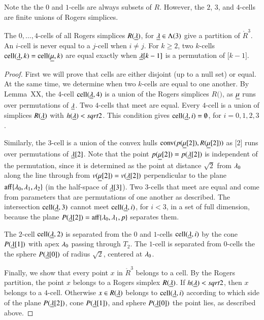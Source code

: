 Note the the $0$ and $1$-cells are always subsets of $R$.  However, the $2$, $3$, and
$4$-cells are finite unions of Rogers simplices.

\begin{lemma}  The $0,\ldots,4$-cells of all Rogers simplices $R({\underline{\lambda}})$, for ${\underline{\lambda}}\in \Lambda(3)$
give a partition of $\ring{R}^3$.  An $i$-cell is never equal to a $j$-cell when $i\ne j$. For $k\ge 2$, 
two $k$-cells $\operatorname{cell}({\underline{\lambda}},k)=\operatorname{cell}({\underline{\mu}},k)$ are equal exactly when ${\underline{\lambda}}[k-1]$
is a permutation of $\bm[k-1]$.
\end{lemma}

\begin{proof}  First we will prove that cells are either disjoint (up to a null set) or equal.  At the same
time, we determine when two $k$-cells are equal to one another.
By Lemma~XX, the $4$-cell $\operatorname{cell}({\underline{\lambda}},4)$ is a union of the Rogers simplices
$R(\bm)$, as ${\underline{\mu}}$ runs over permutations of ${\underline{\lambda}}$. 
 Two $4$-cells
that meet are equal. 
Every $4$-cell is a union of simplices
$R({\underline{\lambda}})$ with $h({\underline{\lambda}})<sqrt2$.  This condition gives $\operatorname{cell}({\underline{\lambda}},i)=\emptyset$, for $i=0,1,2,3$.

Similarly, the $3$-cell is a union
of the convex hulls ${\operatorname{conv}}(p({\underline{\mu}}[2]),R({\underline{\mu}}[2]))$ as $\bm[2]$ runs over permutations of ${\underline{\lambda}}[2]$.  Note that the point $p({\underline{\mu}}[2])=p({\underline{\lambda}}[2])$ is independent of the permutation, since
it is determined as the point at distance $\sqrt2$ from $\lambda_0$ along the line through
from $v({\underline{\mu}}[2])=v({\underline{\lambda}}[2])$ perpendicular to the plane ${\operatorname{aff}}\{\lambda_0,\lambda_1,\lambda_2\}$
(in the half-space of ${\underline{\lambda}}[3]$). Two $3$-cells that meet are equal and come from parameters that are permutations of
one another as described.   The intersection $\operatorname{cell}({\underline{\lambda}},3)$ cannot meet $\operatorname{cell}({\underline{\lambda}},i)$, for $i<3$, in
a set of full dimension, because the plane $P({\underline{\lambda}}[2])={\operatorname{aff}}\{\lambda_0,\lambda_1,p\}$ separates them.

The $2$-cell $\operatorname{cell}({\underline{\lambda}},2)$ is separated from the $0$ and $1$-cells $\operatorname{cell}({\underline{\lambda}},i)$
by the cone $P({\underline{\lambda}}[1])$ with apex $\lambda_0$
passing through $T_2$. The $1$-cell is separated from $0$-cells the the sphere $P({\underline{\lambda}}[0])$
of radius
$\sqrt2$, centered at $\lambda_0$.

Finally, we show that every point $x$ in $\ring{R}^3$ belongs to a cell.  By the Rogers
partition, the point $x$ belongs to a Rogers simplex $R({\underline{\lambda}})$.  If $h({\underline{\lambda}})<sqrt2$, then
$x$ belongs to a $4$-cell.  Otherwise $x\in R({\underline{\lambda}})$ belongs to $\operatorname{cell}({\underline{\lambda}},i)$ according to
which side of the plane $P({\underline{\lambda}}[2])$, cone $P({\underline{\lambda}}[1])$, and sphere $P({\underline{\lambda}}[0])$ the point
lies, as described above.
\end{proof}


